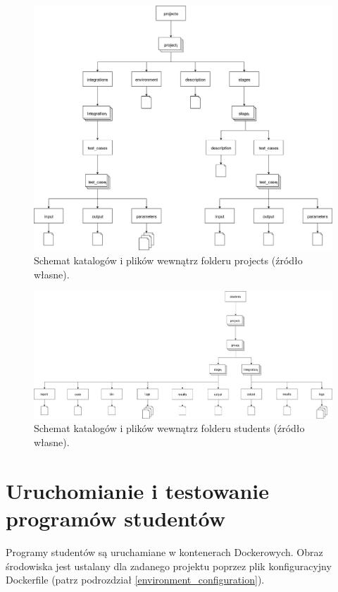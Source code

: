 \begin{figure}[H]
    \centering
    \includegraphics[width = 13cm]{chapter05/projects_dirs.png}
    \caption{Schemat katalogów i plików wewnątrz folderu projects (źródło własne).}
    \label{fig:projects-directories}
\end{figure}

\begin{figure}[H]
    \centering
    \includegraphics[width = 13cm]{chapter05/students_dirs.png}
    \caption{Schemat katalogów i plików wewnątrz folderu students (źródło własne).}
    \label{fig:students-directories}
\end{figure}

\section{Uruchomianie i testowanie programów studentów}
\label{run-and-test}

Programy studentów są uruchamiane w kontenerach Dockerowych.
Obraz środowiska jest ustalany dla zadanego projektu poprzez plik konfiguracyjny Dockerfile (patrz podrozdział \ref{environment_configuration}).

